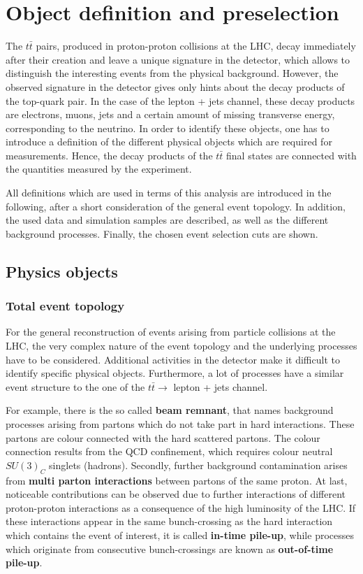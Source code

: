 \chapter{Object definition and preselection}\label{ch4}


The $t\bar{t}$ pairs, produced in proton-proton collisions at the LHC, decay immediately after their creation and leave a unique signature in the detector, which allows to distinguish the interesting events from the physical background. However, the observed signature in the detector gives only hints about the decay products of the top-quark pair.
In the case of the lepton + jets channel, these decay products are electrons, muons, jets and a certain amount of missing transverse energy, corresponding to the neutrino. In order to identify these objects, one has to introduce a definition of the different physical objects which are required for measurements. Hence, the decay products of the $t\bar{t}$ final states are connected with the quantities measured by the experiment.

All definitions which are used in terms of this analysis are introduced in the following, after a short consideration of the general event topology. In addition, the used data and simulation samples are described, as well as the different background processes. Finally, the chosen event selection cuts are shown.
\section{Physics objects}
\subsection{Total event topology}

For the general reconstruction of events arising from particle collisions at the LHC, the very complex nature of the event topology and the underlying processes have to be considered.
Additional activities in the detector make it difficult to identify specific physical objects. Furthermore, a lot of processes have a similar event structure to the one of the $t\bar{t} \rightarrow$ lepton + jets channel.  


 For example, there is the so called  \textbf{beam remnant}, that names background processes arising from partons which do not take part in hard interactions. These partons are colour connected with the hard scattered partons. The colour connection results from the QCD confinement, which requires colour neutral  $SU(3)_C$ singlets (hadrons). Secondly, further background contamination arises from \textbf{multi parton interactions} between partons of the same proton. At last, noticeable contributions can be observed due to
further interactions of different proton-proton interactions as a consequence of the high luminosity of the LHC.
If these interactions appear in the same bunch-crossing  as the hard interaction which contains the event of interest, it is called \textbf{in-time pile-up}, while processes  which originate from consecutive bunch-crossings are known as \textbf{out-of-time pile-up}. 
      
